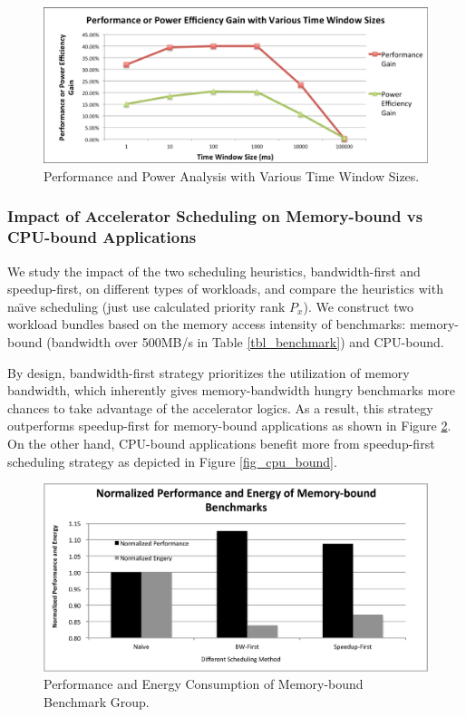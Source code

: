 \begin{figure}
    \centering
    \includegraphics[width=4.5in]{Time-Window-Size}
    \caption{Performance and Power Analysis with Various Time Window Sizes.}
    \label{fig_time_window}
\end{figure}

\subsubsection{Impact of Accelerator Scheduling on Memory-bound vs
  CPU-bound Applications}

We study the impact of the two scheduling heuristics, bandwidth-first
and speedup-first, on different types of workloads, and compare the
heuristics with na\"{\i}ve scheduling (just use calculated priority
rank $P_x$).  We construct two workload bundles based on the memory
access intensity of benchmarks: memory-bound (bandwidth over 500MB/s
in Table \ref{tbl_benchmark}) and CPU-bound.

By design,
bandwidth-first strategy prioritizes the utilization of memory
bandwidth, which inherently gives memory-bandwidth hungry benchmarks
more chances to take advantage of the accelerator logics. As a result,
this strategy outperforms speedup-first for memory-bound
applications as shown in Figure \ref{fig_mem_bound}. On the other hand,
CPU-bound applications benefit more from speedup-first
scheduling strategy as depicted in Figure \ref{fig_cpu_bound}.

\begin{figure}
    \centering
    \includegraphics[width=4.5in]{Memory-Bounded}
    \caption{Performance and Energy Consumption of Memory-bound Benchmark Group.}
    \label{fig_mem_bound}
\end{figure}

